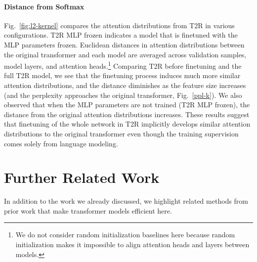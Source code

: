 \documentclass[11pt,a4paper]{article}
\newcommand{\TRNN}{T2R\xspace}
\begin{document}
\paragraph{Distance from Softmax}
Fig.\ \ref{fig:l2-kernel} compares the attention distributions from \TRNN in various configurations.
\TRNN MLP frozen indicates a model that is finetuned with the MLP parameters frozen.
Euclidean distances in attention distributions between the original transformer and each model are averaged across validation samples, model layers, and attention heads.\footnote{We do not consider random initialization baselines here because random initialization makes it impossible to align attention heads and layers between models.}
Comparing \TRNN before finetuning and the full \TRNN model, we see that the finetuning process induces much more similar attention distributions, and the distance diminishes as the feature size increases (and the perplexity approaches the original transformer, Fig.\ \ref{ppl-k}).
We also observed that when the MLP parameters are not trained (\TRNN MLP frozen), the distance from the original attention distributions increases.
These results suggest that finetuning of the whole network in \TRNN implicitly develops similar attention distributions to the original transformer even though the training supervision comes solely from language modeling.





























\section{Further Related Work}
\label{sec:related_work}
In addition to the work we already discussed, we highlight related methods from prior work that make transformer models efficient here.
\end{document}
